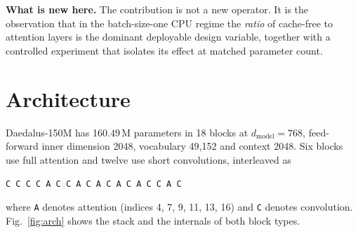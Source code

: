 \documentclass[conference]{IEEEtran}
\begin{document}
\textbf{What is new here.} The contribution is not a new operator. It is the
observation that in the batch-size-one CPU regime the \emph{ratio} of cache-free
to attention layers is the dominant deployable design variable, together with a
controlled experiment that isolates its effect at matched parameter count.

\section{Architecture}

Daedalus-150M has 160.49\,M parameters in 18 blocks at $d_{\text{model}}=768$,
feed-forward inner dimension 2048, vocabulary 49{,}152 and context 2048. Six
blocks use full attention and twelve use short convolutions, interleaved as

\begin{center}
\texttt{C C C C A C C A C A C A C A C C A C}
\end{center}

\noindent where \texttt{A} denotes attention (indices 4, 7, 9, 11, 13, 16) and
\texttt{C} denotes convolution. Fig.~\ref{fig:arch} shows the stack and the
internals of both block types.
\end{document}
